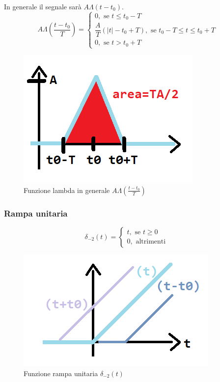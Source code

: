 	In generale il segnale sarà $ A \varLambda(t-t_0) $.\\
	
	\begin{equation*}
	A \varLambda( \frac{t-t_0}{T})=
	\begin{cases} 
	0, \mbox{ se } t \leq t_0-T\\ 
	\dfrac{A}{T}(|t|-t_0+T), \mbox{ se } t_0-T \leq t \leq t_0+T\\ 
	0, \mbox{ se }  t > t_0+T
	\end{cases} 
	\end{equation*}
	
	\begin{figure}[h]
		\centering
		\includegraphics[scale=0.5]{immagini/lambdaGenerale}
		\caption{ Funzione lambda in generale $ A \varLambda( \frac{t-t_0}{T}) $ }
		\label{fig: lambdaGenerale}
	\end{figure}

\pagebreak

\subsubsection{Rampa unitaria}

	\begin{equation*}
	\delta_{-2}(t)=
	\begin{cases} 
	t, \mbox{ se } t \geq 0\\ 
	0, \mbox{ altrimenti }
	\end{cases} 
	\end{equation*}
	
	\begin{figure}[h]
		\centering
		\includegraphics[scale=0.5]{immagini/rampaContinua}
		\caption{ Funzione rampa unitaria $\delta_{-2}(t) $ }
		\label{fig: rampaContinua}
	\end{figure}

